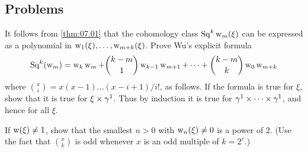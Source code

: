 \documentclass[../main]{subfiles}
\begin{document}
\subsection*{Problems}
\begin{problem}
\label{prob:08.01}
It follows from \ref{thm:07.01} that the cohomology class $\operatorname{Sq}^k \operatorname{w}_m(\xi)$ can be expressed as a polynomial in $\operatorname{w}_{1}(\xi), \dots, \operatorname{w}_{m+k}(\xi)$. Prove Wu's explicit formula
\[\operatorname{Sq}^{k}(\operatorname{w}_{m})=\operatorname{w}_{k} \operatorname{w}_{m}+\binom{k-m}{1} \operatorname{w}_{k-1} \operatorname{w}_{m+1}+\dots+\binom{k-m}{k}\operatorname{w}_{0} \operatorname{w}_{m+k}\]
where $\binom{x}{i} =x(x-1) \dots(x-i+1) / i !$, as follows. If the formula is true for $\xi$, show that it is true for $\xi \times \gamma^{1}$. Thus by induction it is true for $\gamma^{1} \times \dots \times \gamma^{1}$, and hence for all $\xi$.
\end{problem}
\begin{problem}
\label{prob:08.02}
If $\operatorname{w}(\xi) \neq 1$, show that the smallest $n>0$ with $\operatorname{w}_{ n }(\xi) \neq 0$ is a power of 2. (Use the fact that $\binom{x}{k}$ is odd whenever $x$ is an odd multiple of $k=2^{r}$.)
\end{problem}
\end{document}
